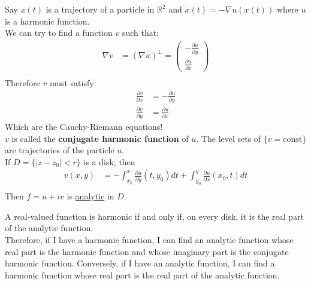 \begin{proposition}
    Say $x(t)$ is a trajectory of a particle in $\mathbb{R}^2$ and $\dot{x}(t) = -\nabla u(x(t))$ where $u$ is a harmonic function.\\
    We can try to find a function $v$ such that:
    \begin{align*}
        \nabla v & = (\nabla u)^\perp = \begin{pmatrix}
                                            -\frac{\partial u}{\partial y} \\
                                            \frac{\partial u}{\partial x}
                                        \end{pmatrix} \\
    \end{align*}
    Therefore $v$ must satisfy:
    \begin{align*}
        \frac{\partial v}{\partial x} & = -\frac{\partial u}{\partial y} \\
        \frac{\partial v}{\partial y} & = \frac{\partial u}{\partial x}
    \end{align*}
    Which are the Cauchy-Riemann equations!\\
    $v$ is called the \textbf{conjugate harmonic function} of $u$. The level sets of $\{v = \text{const}\}$ are trajectories of the particle $u$.\\

    If $D = \{|z - z_0| < r\}$ is a disk, then
    \begin{align*}
        v(x, y) & = - \int_{x_0}^x \frac{\partial u}{\partial y}(t,y_0) dt + \int_{y_0}^y \frac{\partial u}{\partial x}(x_0, t) dt \\
    \end{align*}
    Then $f = u + iv$ is \underline{analytic} in $D$.
\end{proposition}

\begin{theorem}
    A real-valued function is harmonic if and only if, on every disk, it is the real part of the analytic function.\\
    Therefore, if I have a harmonic function, I can find an analytic function whose real part is the harmonic function and whose imaginary part is the conjugate harmonic function. Conversely, if I have an analytic function, I can find a harmonic function whose real part is the real part of the analytic function.
\end{theorem}


